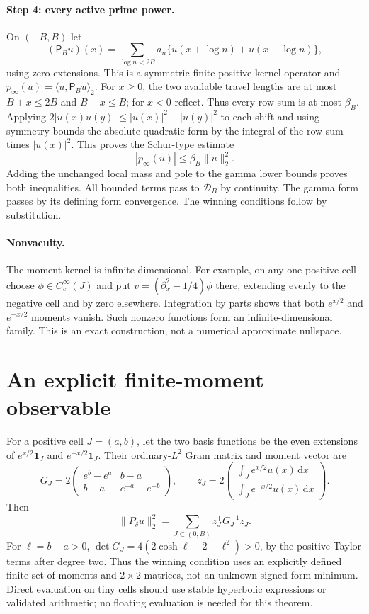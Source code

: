 \documentclass[11pt]{article}
\newcommand{\dd}{\,\mathrm d}
\newcommand{\norm}[1]{\lVert#1\rVert}
\begin{document}
\paragraph{Step 4: every active prime power.}
On $(-B,B)$ let
\[
 (\mathsf P_Bu)(x)=\sum_{\log n<2B}a_n
       \{u(x+\log n)+u(x-\log n)\},
\]
using zero extensions. This is a symmetric finite positive-kernel operator and $p_\infty(u)=\langle u,\mathsf P_Bu\rangle_2$. For $x\ge0$, the two available travel lengths are at most $B+x\le2B$ and $B-x\le B$; for $x<0$ reflect. Thus every row sum is at most $\beta_B$. Applying $2|u(x)u(y)|\le |u(x)|^2+|u(y)|^2$ to each shift and using symmetry bounds the absolute quadratic form by the integral of the row sum times $|u(x)|^2$. This proves the Schur-type estimate
\begin{equation}
 |p_\infty(u)|\le\beta_B\norm u_2^2.
 \label{eq:primebound}
\end{equation}
Adding the unchanged local mass and pole to the gamma lower bounds proves both inequalities. All bounded terms pass to $\mathcal D_B$ by continuity. The gamma form passes by its defining form convergence. The winning conditions follow by substitution.

\paragraph{Nonvacuity.}
The moment kernel is infinite-dimensional. For example, on any one positive cell choose $\phi\in C_c^\infty(J)$ and put $v=(\partial_x^2-1/4)\phi$ there, extending evenly to the negative cell and by zero elsewhere. Integration by parts shows that both $e^{x/2}$ and $e^{-x/2}$ moments vanish. Such nonzero functions form an infinite-dimensional family. This is an exact construction, not a numerical approximate nullspace.

\section{An explicit finite-moment observable}
For a positive cell $J=(a,b)$, let the two basis functions be the even extensions of $e^{x/2}\mathbf1_J$ and $e^{-x/2}\mathbf1_J$. Their ordinary-$L^2$ Gram matrix and moment vector are
\[
 G_J=2\begin{pmatrix}e^b-e^a&b-a\\ b-a&e^{-a}-e^{-b}\end{pmatrix},
 \qquad z_J=2\begin{pmatrix}\int_J e^{x/2}u(x)\dd x\\
                              \int_J e^{-x/2}u(x)\dd x\end{pmatrix}.
\]
Then
\begin{equation}
 \norm{P_\delta u}_2^2=\sum_{J\subset(0,B)}z_J^{\mathsf T}G_J^{-1}z_J.
 \label{eq:observable}
\end{equation}
For $\ell=b-a>0$, $\det G_J=4(2\cosh\ell-2-\ell^2)>0$, by the positive Taylor terms after degree two. Thus the winning condition uses an explicitly defined finite set of moments and $2\times2$ matrices, not an unknown signed-form minimum. Direct evaluation on tiny cells should use stable hyperbolic expressions or validated arithmetic; no floating evaluation is needed for this theorem.
\end{document}
